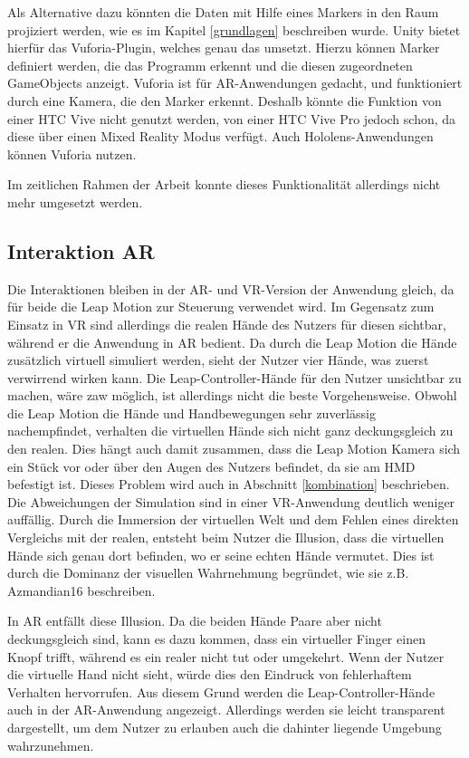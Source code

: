 Als Alternative dazu könnten die Daten mit Hilfe eines Markers in den Raum projiziert werden, wie es im Kapitel \ref{grundlagen} beschreiben wurde. Unity bietet hierfür das Vuforia-Plugin, welches genau das umsetzt. Hierzu können Marker definiert werden, die das Programm erkennt und die diesen zugeordneten GameObjects anzeigt. 
Vuforia ist für AR-Anwendungen gedacht, und funktioniert durch eine Kamera, die den Marker erkennt. Deshalb könnte die Funktion von einer HTC Vive nicht genutzt werden, von einer HTC Vive Pro jedoch schon, da diese über einen Mixed Reality Modus verfügt. Auch Hololens-Anwendungen können Vuforia nutzen. 

Im zeitlichen Rahmen der Arbeit konnte dieses Funktionalität allerdings nicht mehr umgesetzt werden.

\subsection{Interaktion AR}

Die Interaktionen bleiben in der AR- und VR-Version der Anwendung gleich, da für beide die Leap Motion zur Steuerung verwendet wird.
Im Gegensatz zum Einsatz in VR sind allerdings die realen Hände des Nutzers für diesen sichtbar, während er die Anwendung in AR bedient. Da durch die Leap Motion die Hände zusätzlich virtuell simuliert werden, sieht der Nutzer vier Hände, was zuerst verwirrend wirken kann. 
Die Leap-Controller-Hände für den Nutzer unsichtbar zu machen, wäre zaw möglich, ist allerdings nicht die beste Vorgehensweise. Obwohl die Leap Motion die Hände und Handbewegungen sehr zuverlässig nachempfindet, verhalten die virtuellen Hände sich nicht ganz deckungsgleich zu den realen. Dies hängt auch damit zusammen, dass die Leap Motion Kamera sich ein Stück vor oder über den Augen des Nutzers befindet, da sie am HMD befestigt ist. Dieses Problem wird auch in Abschnitt \ref{kombination} beschrieben.
Die Abweichungen der Simulation sind in einer VR-Anwendung deutlich weniger auffällig. Durch die Immersion der virtuellen Welt und dem Fehlen eines direkten Vergleichs mit der realen, entsteht beim Nutzer die Illusion, dass die virtuellen Hände sich genau dort befinden, wo er seine echten Hände vermutet. Dies ist durch die Dominanz der visuellen Wahrnehmung begründet, wie sie z.B. Azmandian16 beschreiben.

In AR entfällt diese Illusion. Da die beiden Hände Paare aber nicht deckungsgleich sind, kann es dazu kommen, dass ein virtueller Finger einen Knopf trifft, während es ein realer nicht tut oder umgekehrt. Wenn der Nutzer die virtuelle Hand nicht sieht, würde dies den Eindruck von fehlerhaftem Verhalten hervorrufen. 
Aus diesem Grund werden die Leap-Controller-Hände auch in der AR-Anwendung angezeigt. Allerdings werden sie leicht transparent dargestellt, um dem Nutzer zu erlauben auch die dahinter liegende Umgebung wahrzunehmen. 

